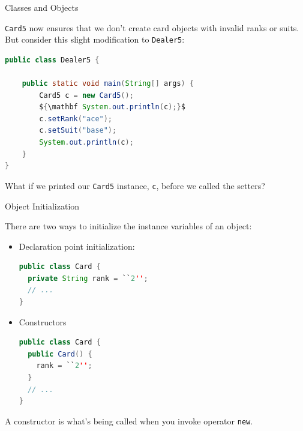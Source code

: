 \documentclass{beamer}
\begin{document}
\begin{frame}[fragile]{Classes and Objects}


{\tt Card5} now ensures that we don't create card objects with invalid ranks or suits.
But consider this slight modification to {\tt Dealer5}:
\begin{lstlisting}[language=Java,mathescape=true]
public class Dealer5 {

    public static void main(String[] args) {
        Card5 c = new Card5();
        ${\mathbf System.out.println(c);}$
        c.setRank("ace");
        c.setSuit("base");
        System.out.println(c);
    }
}
\end{lstlisting}

What if we printed our {\tt Card5} instance, {\tt c}, before we called the setters?

\end{frame}

\begin{frame}[fragile]{Object Initialization}


There are two ways to initialize the instance variables of an object:
\begin{itemize}
\item Declaration point initialization:
\begin{lstlisting}[language=Java,mathescape=true]
public class Card {
  private String rank = ``2'';
  // ...
}
\end{lstlisting}
\item Constructors
\begin{lstlisting}[language=Java,mathescape=true]
public class Card {
  public Card() {
    rank = ``2'';
  }
  // ...
}
\end{lstlisting}

\end{itemize}
A constructor is what's being called when you invoke operator {\tt new}.
\end{frame}
\end{document}
